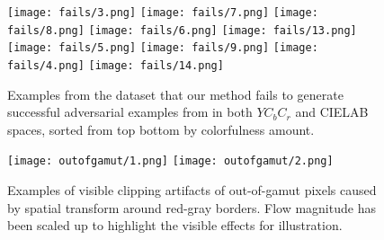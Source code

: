 
\begin{figure}[t]
    \texttt{[image: fails/3.png]}
    \texttt{[image: fails/7.png]}
    \texttt{[image: fails/8.png]}
    \texttt{[image: fails/6.png]}
    \texttt{[image: fails/13.png]}
    \texttt{[image: fails/5.png]}
    \texttt{[image: fails/9.png]}
    \texttt{[image: fails/4.png]}
    \texttt{[image: fails/14.png]}
    \caption{Examples from the dataset that our method fails to generate successful adversarial examples from in both \(YC_{b}C_{r}\) and CIELAB spaces, sorted from top bottom by colorfulness amount.}\label{fig:fails}
\end{figure}


\begin{figure}[H]
    \texttt{[image: outofgamut/1.png]}
    \texttt{[image: outofgamut/2.png]}
    \caption{Examples of visible clipping artifacts of out-of-gamut pixels caused by spatial transform around red-gray borders. Flow magnitude has been scaled up to highlight the visible effects for illustration.}\label{fig:outofgamut}
\end{figure}


